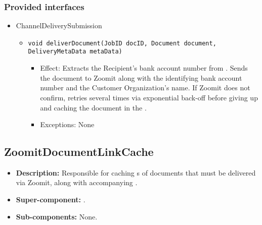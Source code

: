 \subsubsection*{Provided interfaces}
\begin{itemize}
    \item ChannelDeliverySubmission
    \begin{itemize}
        \item \texttt{void deliverDocument(JobID docID, Document document, DeliveryMetaData metaData)}
        \begin{itemize}
            \item Effect: Extracts the Recipient's bank account number from . Sends the document to Zoomit along with the identifying bank account number and the Customer Organization's name. If Zoomit does not confirm, retries several times via exponential back-off before giving up and caching the document in the .
            \item Exceptions: None
        \end{itemize}
    \end{itemize}
\end{itemize}

\subsection{ZoomitDocumentLinkCache}
\begin{itemize}
    \item \textbf{Description:} Responsible for caching s of documents that must be delivered via Zoomit, along with accompanying .
    \item \textbf{Super-component:} .
    \item \textbf{Sub-components:} None.
\end{itemize}

